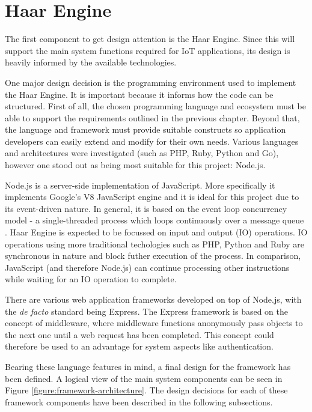   \section{Haar Engine}
    The first component to get design attention is the Haar Engine. Since this will support the main system functions required for IoT applications, its design is heavily informed by the available technologies.

    One major design decision is the programming environment used to implement the Haar Engine. It is important because it informs how the code can be structured. First of all, the chosen programming language and ecosystem must be able to support the requirements outlined in the previous chapter. Beyond that, the language and framework must provide suitable constructs so application developers can easily extend and modify for their own needs. Various languages and architectures were investigated (such as PHP, Ruby, Python and Go), however one stood out as being most suitable for this project: Node.js.

    Node.js is a server-side implementation of JavaScript. More specifically it implements Google's V8 JavaScript engine and it is ideal for this project due to its event-driven nature. In general, it is based on the event loop concurrency model - a single-threaded process which loops continuously over a message queue \citep{event-loop}. Haar Engine is expected to be focussed on input and output (IO) operations. IO operations using more traditional techologies such as PHP, Python and Ruby are synchronous in nature and block futher execution of the process. In comparison, JavaScript (and therefore Node.js) can continue processing other instructions while waiting for an IO operation to complete.

    There are various web application frameworks developed on top of Node.js, with the \textit{de facto} standard being Express. The Express framework is based on the concept of middleware, where middleware functions anonymously pass objects to the next one until a web request has been completed. This concept could therefore be used to an advantage for system aspects like authentication.

    Bearing these language features in mind, a final design for the framework has been defined. A logical view of the main system components can be seen in Figure \ref{figure:framework-architecture}. The design decisions for each of these framework components have been described in the following subsections.

